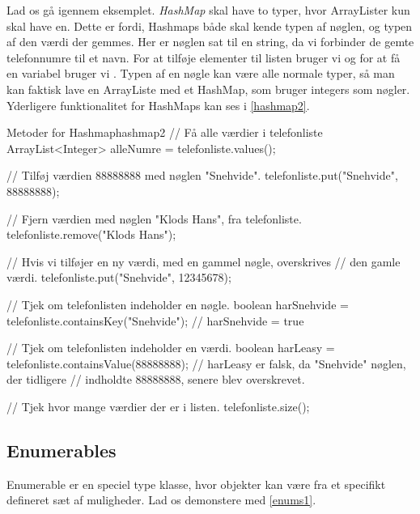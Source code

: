 Lad os gå igennem eksemplet. \emph{HashMap} skal have to typer, hvor
ArrayLister kun skal have en.  Dette er fordi, Hashmaps både skal
kende typen af nøglen, og typen af den værdi der gemmes. Her er
nøglen sat til en string, da vi forbinder de gemte telefonnumre til et
navn.
For at tilføje elementer til listen bruger vi 
og for at få en variabel bruger vi .
Typen af en nøgle kan være alle normale typer, så man kan faktisk lave en
ArrayListe med et HashMap, som bruger integers som nøgler. Yderligere
funktionalitet for HashMaps kan ses i \autoref{hashmap2}.

\begin{JavaCode}{Metoder for Hashmap}{hashmap2}
    // Få alle værdier i telefonliste
	ArrayList<Integer> alleNumre = telefonliste.values();

    // Tilføj værdien 88888888 med nøglen "Snehvide".
    telefonliste.put("Snehvide", 88888888);

    // Fjern værdien med nøglen "Klods Hans", fra telefonliste.
	telefonliste.remove("Klods Hans");

    // Hvis vi tilføjer en ny værdi, med en gammel nøgle, overskrives
    // den gamle værdi.
    telefonliste.put("Snehvide", 12345678);

    // Tjek om telefonlisten indeholder en nøgle.
	boolean harSnehvide = telefonliste.containsKey("Snehvide");
    // harSnehvide = true

    // Tjek om telefonlisten indeholder en værdi.
	boolean harLeasy = telefonliste.containsValue(88888888);
    // harLeasy er falsk, da "Snehvide" nøglen, der tidligere
    // indholdte 88888888, senere blev overskrevet.

    // Tjek hvor mange værdier der er i listen.
	telefonliste.size();
\end{JavaCode}



\subsection{Enumerables}

Enumerable er en speciel type klasse, hvor objekter kan være fra et
specifikt defineret sæt af muligheder. Lad os demonstere med
\autoref{enums1}.

